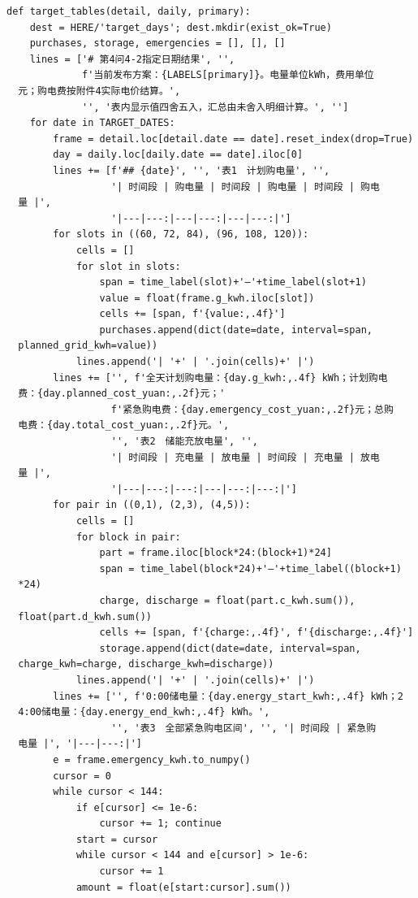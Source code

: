 \begin{verbatim}
def target_tables(detail, daily, primary):
    dest = HERE/'target_days'; dest.mkdir(exist_ok=True)
    purchases, storage, emergencies = [], [], []
    lines = ['# 第4问4-2指定日期结果', '',
             f'当前发布方案：{LABELS[primary]}。电量单位kWh，费用单位
  元；购电费按附件4实际电价结算。',
             '', '表内显示值四舍五入，汇总由未舍入明细计算。', '']
    for date in TARGET_DATES:
        frame = detail.loc[detail.date == date].reset_index(drop=True)
        day = daily.loc[daily.date == date].iloc[0]
        lines += [f'## {date}', '', '表1　计划购电量', '',
                  '| 时间段 | 购电量 | 时间段 | 购电量 | 时间段 | 购电
  量 |',
                  '|---|---:|---|---:|---|---:|']
        for slots in ((60, 72, 84), (96, 108, 120)):
            cells = []
            for slot in slots:
                span = time_label(slot)+'—'+time_label(slot+1)
                value = float(frame.g_kwh.iloc[slot])
                cells += [span, f'{value:,.4f}']
                purchases.append(dict(date=date, interval=span,
  planned_grid_kwh=value))
            lines.append('| '+' | '.join(cells)+' |')
        lines += ['', f'全天计划购电量：{day.g_kwh:,.4f} kWh；计划购电
  费：{day.planned_cost_yuan:,.2f}元；'
                  f'紧急购电费：{day.emergency_cost_yuan:,.2f}元；总购
  电费：{day.total_cost_yuan:,.2f}元。',
                  '', '表2　储能充放电量', '',
                  '| 时间段 | 充电量 | 放电量 | 时间段 | 充电量 | 放电
  量 |',
                  '|---|---:|---:|---|---:|---:|']
        for pair in ((0,1), (2,3), (4,5)):
            cells = []
            for block in pair:
                part = frame.iloc[block*24:(block+1)*24]
                span = time_label(block*24)+'—'+time_label((block+1)
  *24)
                charge, discharge = float(part.c_kwh.sum()),
  float(part.d_kwh.sum())
                cells += [span, f'{charge:,.4f}', f'{discharge:,.4f}']
                storage.append(dict(date=date, interval=span,
  charge_kwh=charge, discharge_kwh=discharge))
            lines.append('| '+' | '.join(cells)+' |')
        lines += ['', f'0:00储电量：{day.energy_start_kwh:,.4f} kWh；2
  4:00储电量：{day.energy_end_kwh:,.4f} kWh。',
                  '', '表3　全部紧急购电区间', '', '| 时间段 | 紧急购
  电量 |', '|---|---:|']
        e = frame.emergency_kwh.to_numpy()
        cursor = 0
        while cursor < 144:
            if e[cursor] <= 1e-6:
                cursor += 1; continue
            start = cursor
            while cursor < 144 and e[cursor] > 1e-6:
                cursor += 1
            amount = float(e[start:cursor].sum())

\end{verbatim}
